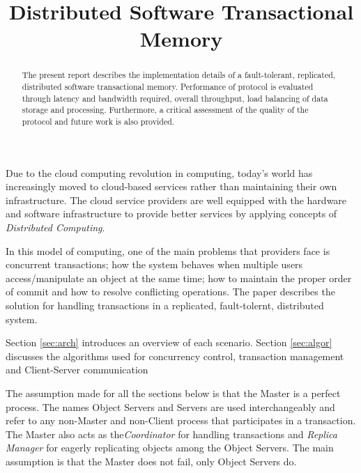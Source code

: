 \documentclass[times, 10pt,twocolumn]{article}
\begin{document}
\title{Distributed Software Transactional Memory}

\maketitle
\thispagestyle{empty}

\begin{abstract}
   The present report describes the implementation details of a fault-tolerant,
   replicated, distributed software transactional memory. Performance of protocol is
   evaluated through latency and bandwidth required, overall throughput, load balancing
   of data storage and processing.
   Furthermore, a critical assessment of the quality of the protocol and future work is 
   also provided. 
\end{abstract}

Due to the cloud computing revolution in computing, 
today’s world has increasingly moved to cloud-based services rather than maintaining their 
own infrastructure. The cloud service providers are well equipped with the hardware and
 software infrastructure to provide better services by applying concepts of {\it Distributed Computing}. 

In this model of computing, one of the main problems that providers face is concurrent transactions;
 how the system behaves when multiple users access/manipulate an object at the same time; how to maintain 
the proper order of commit and how to resolve conflicting operations. 
The paper describes the solution for handling transactions in a replicated, fault-tolernt, distributed system. 

Section \ref{sec:arch} introduces an overview of each scenario. Section 
\ref{sec:algor} discusses the algorithms used for concurrency control, 
transaction management and Client-Server communication


\label{sec:arch}

The assumption made for all the sections below is that the Master is a perfect process. 
The names Object Servers and Servers are used interchangeably and refer to any non-Master and non-Client process
 that participates in a transaction.
The Master also acts as the{\it Coordinator} for handling transactions and {\it Replica Manager} for eagerly replicating
objects among the Object Servers. The main assumption is that the Master does not fail, only Object Servers do.
\end{document}

